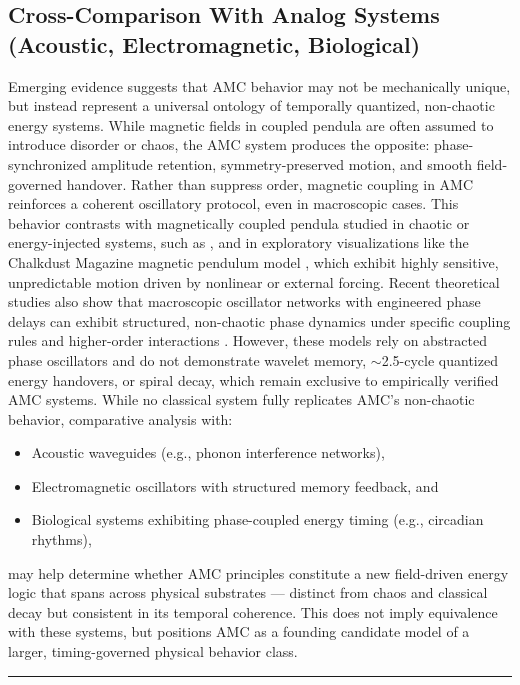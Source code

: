 \documentclass[10pt,aps,pre,onecolumn,superscriptaddress,notitlepage]{revtex4-2}
\begin{document}
\subsection{Cross-Comparison With Analog Systems (Acoustic, Electromagnetic, Biological)}
Emerging evidence suggests that AMC behavior may not be mechanically unique, but instead represent a universal ontology of temporally quantized, non-chaotic energy systems.
 While magnetic fields in coupled pendula are often assumed to introduce disorder or chaos, the AMC system produces the opposite: phase-synchronized amplitude retention, symmetry-preserved motion, and smooth field-governed handover. Rather than suppress order, magnetic coupling in AMC reinforces a coherent oscillatory protocol, even in macroscopic cases.
 This behavior contrasts with magnetically coupled pendula studied in chaotic or energy-injected systems, such as \cite{saha2023chaotic}, and in exploratory visualizations like the Chalkdust Magazine magnetic pendulum model \cite{chalkdust2024}, which exhibit highly sensitive, unpredictable motion driven by nonlinear or external forcing.
Recent theoretical studies also show that macroscopic oscillator networks with engineered phase delays can exhibit structured, non-chaotic phase dynamics under specific coupling rules and higher-order interactions \cite{disanto2025complexity}. However, these models rely on abstracted phase oscillators and do not demonstrate wavelet memory, $\sim$2.5-cycle quantized energy handovers, or spiral decay, which remain exclusive to empirically verified AMC systems. While no classical system fully replicates AMC’s non-chaotic behavior, comparative analysis with:
\begin{itemize}
    \item Acoustic waveguides (e.g., phonon interference networks),
    \item Electromagnetic oscillators with structured memory feedback, and
    \item Biological systems exhibiting phase-coupled energy timing (e.g., circadian rhythms),
\end{itemize}
may help determine whether AMC principles constitute a new field-driven energy logic that spans across physical substrates — distinct from chaos and classical decay but consistent in its temporal coherence. This does not imply equivalence with these systems, but positions AMC as a founding candidate model of a larger, timing-governed physical behavior class. 
\vspace{1em}
\hrule
\vspace{1em}
\clearpage
\end{document}
